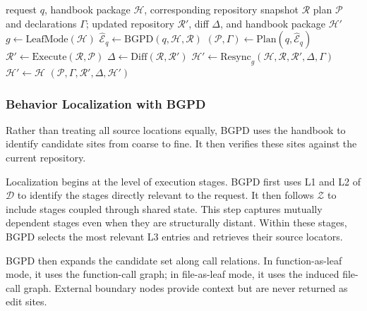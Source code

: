 \documentclass[]{ailab}
\newcommand{\hbsmall}{\textsf{function-as-leaf}}
\newcommand{\hblarge}{\textsf{file-as-leaf}}
\begin{document}
\begin{algorithm}[H]
\caption{Handbook-Guided Modification with Automatic Resynchronization}
\label{alg:bgpd}
\vspace{0.3em}
\begin{minipage}{0.94\linewidth}
\footnotesize
\begin{algorithmic}[1]
\Require request $q$, handbook package $\mathcal{H}$, corresponding repository
snapshot $\mathcal{R}$
\Ensure plan $\mathcal{P}$ and declarations $\Gamma$; updated repository
$\mathcal{R}'$, diff $\Delta$, and handbook package $\mathcal{H}'$
\State $g \leftarrow \mathrm{LeafMode}(\mathcal{H})$
\State $\widehat{\mathcal{E}}_q \leftarrow
\mathrm{BGPD}(q,\mathcal{H},\mathcal{R})$
\State $(\mathcal{P},\Gamma) \leftarrow
\mathrm{Plan}(q,\widehat{\mathcal{E}}_q)$
\State $\mathcal{R}' \leftarrow \mathrm{Execute}(\mathcal{R},\mathcal{P})$
\State $\Delta \leftarrow \mathrm{Diff}(\mathcal{R},\mathcal{R}')$
\If{$\Delta \neq \emptyset$}
    \State $\mathcal{H}' \leftarrow
    \mathrm{Resync}_{g}(\mathcal{H},\mathcal{R},\mathcal{R}',\Delta,\Gamma)$
\Else
    \State $\mathcal{H}' \leftarrow \mathcal{H}$
    \EndIf
\State \Return $(\mathcal{P},\Gamma,\mathcal{R}',\Delta,\mathcal{H}')$
\end{algorithmic}
\end{minipage}
\end{algorithm}

\subsubsection{Behavior Localization with BGPD}

Rather than treating all source locations equally, BGPD uses the handbook to
identify candidate sites from coarse to fine. It then verifies these sites
against the current repository.

Localization begins at the level of execution stages. BGPD first uses L1 and L2
of $\mathcal{D}$ to identify the stages directly relevant to the request. It
then follows $\mathcal{Z}$ to include stages coupled through shared state. This
step captures mutually dependent stages even when they are structurally distant.
Within these stages, BGPD selects the most relevant L3 entries and retrieves
their source locators.

BGPD then expands the candidate set along call relations. In \hbsmall{} mode, it
uses the function-call graph; in \hblarge{} mode, it uses the induced file-call
graph. External boundary nodes provide context but are never returned as edit
sites.
\end{document}

